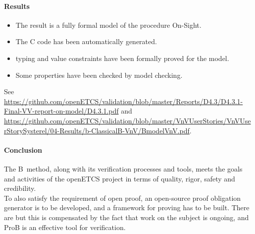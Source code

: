 \paragraph{Results}


\begin{itemize}
\item The result is a fully formal model of the procedure On-Sight.
\item The C code has been automatically generated.
\item typing and value constraints have been formally proved for the model.
\item Some properties have been checked by model checking.
\end{itemize}

See
{\url{https://github.com/openETCS/validation/blob/master/Reports/D4.3/D4.3.1-Final-VV-report-on-model/D4.3.1.pdf}}
and
{\url{https://github.com/openETCS/validation/blob/master/VnVUserStories/VnVUserStorySysterel/04-Results/b-ClassicalB-VnV/BmodelVnV.pdf}}.





\paragraph{Conclusion}

The B~method, along with its verification processes and tools, meets
the goals and activities of the openETCS project in terms of quality,
rigor, safety and credibility.\\ 
To also satisfy the requirement of open proof, an open-source proof
obligation generator is to be developed, and a framework for
proving has to be built. There are  but this is compensated by the fact that work on the subject
is ongoing, and ProB is an effective tool for verification.
